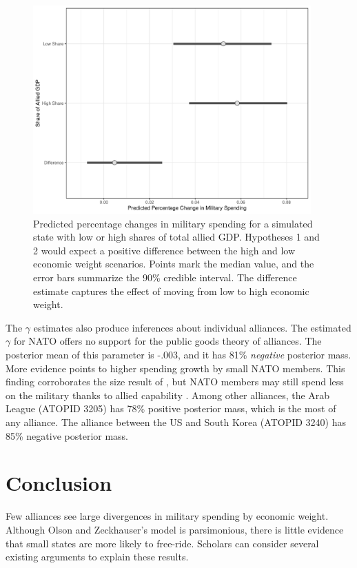 \documentclass[12pt]{article}
\begin{document}
\begin{figure}[htbp]
	\centering
		\includegraphics[width=0.95\textwidth]{pred-change-share.pdf}
	\caption{Predicted percentage changes in military spending for a simulated state with low or high shares of total allied GDP. Hypotheses 1 and 2 would expect a positive difference between the high and low economic weight scenarios. Points mark the median value, and the error bars summarize the 90\% credible interval. The difference estimate captures the effect of moving from low to high economic weight.}
	\label{fig:pred-change-share}
\end{figure}


The $\gamma$ estimates also produce inferences about individual alliances.
The estimated $\gamma$ for NATO offers no support for the public goods theory of alliances. 
The posterior mean of this parameter is -.003, and it has 81\% \emph{negative} posterior mass.  
More evidence points to higher spending growth by small NATO members. 
This finding corroborates the size result of \citet{PluemperNeumayer2015}, but NATO members may still spend less on the military thanks to allied capability \citep{GeorgeSandler2017}.
Among other alliances, the Arab League (ATOPID 3205) has 78\% positive posterior mass, which is the most of any alliance. 
The alliance between the US and South Korea (ATOPID 3240) has 85\% negative posterior mass. 


\section{Conclusion}

Few alliances see large divergences in military spending by economic weight. 
Although Olson and Zeckhauser's model is parsimonious, there is little evidence that small states are more likely to free-ride.  
Scholars can consider several existing arguments to explain these results. 
\end{document}
